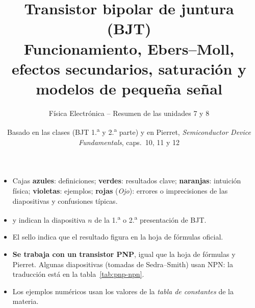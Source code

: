 \documentclass[11pt,a4paper]{article}
\title{\color{azul}\textbf{Transistor bipolar de juntura (BJT)}\\[0.3em]
  \large Funcionamiento, Ebers--Moll, efectos secundarios, saturación y modelos de pequeña señal}
\author{Física Electrónica -- Resumen de las unidades 7 y 8}
\date{Basado en las clases (BJT 1.\textsuperscript{a} y 2.\textsuperscript{a} parte) y en Pierret,
\emph{Semiconductor Device Fundamentals}, caps.~10, 11 y 12}
\begin{document}
\maketitle
\thispagestyle{empty}

\begin{tcolorbox}[base,colback=white,colframe=gris,title={Cómo leer este apunte}]
\small
\begin{itemize}
  \item Cajas \textcolor{azul}{\textbf{azules}}: definiciones; \textcolor{verde}{\textbf{verdes}}: resultados
  clave; \textcolor{naranja}{\textbf{naranjas}}: intuición física; \textcolor{violeta}{\textbf{violetas}}: ejemplos;
  \textcolor{rojo}{\textbf{rojas}} (\emph{Ojo}): errores o imprecisiones de las diapositivas y confusiones típicas.
  \item {} y  indican la diapositiva $n$ de la 1.\textsuperscript{a} o 2.\textsuperscript{a}
  presentación de BJT.
  \item El sello \enhojatexto{} indica que el resultado figura en la hoja de fórmulas oficial.
  \item \textbf{Se trabaja con un transistor PNP}, igual que la hoja de fórmulas y Pierret. Algunas
  diapositivas (tomadas de Sedra--Smith) usan NPN: la traducción está en la tabla~\ref{tab:pnp-npn}.
  \item Los ejemplos numéricos usan los valores de la \emph{tabla de constantes} de la materia.
\end{itemize}
\end{tcolorbox}

\tableofcontents
\newpage










\end{document}
